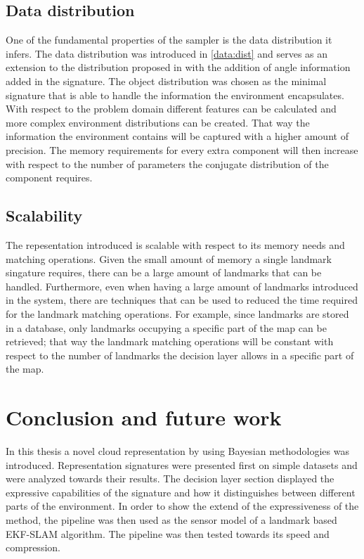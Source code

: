 \documentclass[twoside,hidelinks]{article}
\begin{document}
\subsection{Data distribution}

One of the fundamental properties of the sampler is the data distribution it infers. The data distribution was introduced in \ref{data:dist}  and serves as an extension to the distribution proposed in \cite{dependentDiri} with the addition of angle information added in the signature. The object distribution was chosen as the minimal signature that is able to handle the information the environment encapsulates. With respect to the problem domain different features can be calculated and more complex environment distributions can be created. That way the information the environment contains will be captured with a higher amount of precision. The memory requirements for every extra component will then increase with respect to the number of parameters the conjugate distribution of the component requires. 


\subsection{Scalability}

The repesentation introduced is scalable with respect to its memory needs and matching operations. Given the small amount of memory a single landmark singature requires, there can be a large amount of landmarks that can be handled. Furthermore, even when having a large amount of landmarks introduced in the system, there are techniques that can be used to reduced the time required for the landmark matching operations. For example, since landmarks are stored in a database, only landmarks occupying a specific part of the map can be retrieved; that way the landmark matching operations will be constant with respect to the number of landmarks the decision layer allows in a specific part of the map. 


\newpage
\section{Conclusion and future work}
\label{sec:conclusion}

 In this thesis a novel cloud representation by using Bayesian methodologies was introduced. Representation signatures were presented first on simple datasets and were analyzed towards their results. The decision layer section displayed the expressive capabilities of the signature and how it distinguishes between different parts of the environment. In order to show the extend of the expressiveness of the method, the pipeline was then used as the sensor model of a landmark based EKF-SLAM algorithm. The pipeline was then tested towards its speed and compression.
\end{document}
